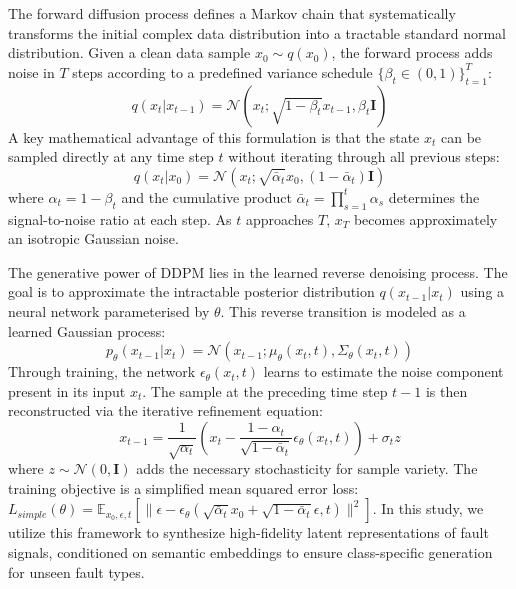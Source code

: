\documentclass[journal]{IEEEtran}
\begin{document}
The forward diffusion process defines a Markov chain that systematically transforms the initial complex data distribution into a tractable standard normal distribution. Given a clean data sample $x_0 \sim q(x_0)$, the forward process adds noise in $T$ steps according to a predefined variance schedule $\{\beta_t \in (0,1)\}_{t=1}^T$:
\begin{equation}
q(x_t|x_{t-1}) = \mathcal{N}(x_t; \sqrt{1-\beta_t}x_{t-1}, \beta_t \mathbf{I})
\end{equation}
A key mathematical advantage of this formulation is that the state $x_t$ can be sampled directly at any time step $t$ without iterating through all previous steps:
\begin{equation}
q(x_t|x_0) = \mathcal{N}(x_t; \sqrt{\bar{\alpha}_t}x_0, (1-\bar{\alpha}_t)\mathbf{I})
\end{equation}
where $\alpha_t = 1 - \beta_t$ and the cumulative product $\bar{\alpha}_t = \prod_{s=1}^t \alpha_s$ determines the signal-to-noise ratio at each step. As $t$ approaches $T$, $x_T$ becomes approximately an isotropic Gaussian noise.

The generative power of DDPM lies in the learned reverse denoising process. The goal is to approximate the intractable posterior distribution $q(x_{t-1}|x_t)$ using a neural network parameterised by $\theta$. This reverse transition is modeled as a learned Gaussian process:
\begin{equation}
p_\theta(x_{t-1}|x_t) = \mathcal{N}(x_{t-1}; \mu_\theta(x_t, t), \Sigma_\theta(x_t, t))
\end{equation}
Through training, the network $\epsilon_\theta(x_t, t)$ learns to estimate the noise component present in its input $x_t$. The sample at the preceding time step $t-1$ is then reconstructed via the iterative refinement equation:
\begin{equation}
x_{t-1} = \frac{1}{\sqrt{\alpha_t}} \left( x_t - \frac{1-\alpha_t}{\sqrt{1-\bar{\alpha}_t}} \epsilon_\theta(x_t, t) \right) + \sigma_t z
\end{equation}
where $z \sim \mathcal{N}(0, \mathbf{I})$ adds the necessary stochasticity for sample variety. The training objective is a simplified mean squared error loss: $L_{simple}(\theta) = \mathbb{E}_{x_0, \epsilon, t} [ \| \epsilon - \epsilon_\theta(\sqrt{\bar{\alpha}_t}x_0 + \sqrt{1-\bar{\alpha}_t}\epsilon, t) \|^2 ]$.
In this study, we utilize this framework to synthesize high-fidelity latent representations of fault signals, conditioned on semantic embeddings to ensure class-specific generation for unseen fault types.
\end{document}
